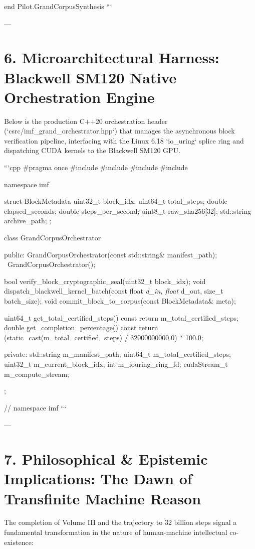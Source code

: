 \documentclass[11pt,twoside,openright]{amsbook}
\begin{document}
{end Pilot.GrandCorpusSynthesis
```

---

\section{6. Microarchitectural Harness: Blackwell SM120 Native Orchestration Engine}

Below is the production C++20 orchestration header (`csrc/imf_grand_orchestrator.hpp`) that manages the asynchronous block verification pipeline, interfacing with the Linux 6.18 `io_uring` splice ring and dispatching CUDA kernels to the Blackwell SM120 GPU.

```cpp
#pragma once
#include 
#include 
#include 
#include 

namespace imf {

struct BlockMetadata {
    uint32_t block_idx;
    uint64_t total_steps;
    double elapsed_seconds;
    double steps_per_second;
    uint8_t raw_sha256[32];
    std::string archive_path;
};

class GrandCorpusOrchestrator {
public:
    GrandCorpusOrchestrator(const std::string& manifest_path);
    ~GrandCorpusOrchestrator();

    bool verify_block_cryptographic_seal(uint32_t block_idx);
    void dispatch_blackwell_kernel_batch(const float\textit{ d_in, float} d_out, size_t batch_size);
    void commit_block_to_corpus(const BlockMetadata& meta);

    uint64_t get_total_certified_steps() const { return m_total_certified_steps; }
    double get_completion_percentage() const {
        return (static_cast(m_total_certified_steps) / 32000000000.0) * 100.0;
    }

private:
    std::string m_manifest_path;
    uint64_t m_total_certified_steps;
    uint32_t m_current_block_idx;
    int m_iouring_ring_fd;
    cudaStream_t m_compute_stream;
};

} // namespace imf
```

---

\section{7. Philosophical & Epistemic Implications: The Dawn of Transfinite Machine Reason}

The completion of Volume III and the trajectory to 32 billion steps signal a fundamental transformation in the nature of human-machine intellectual co-existence:

}
\end{document}
